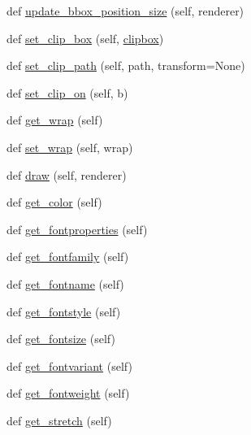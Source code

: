 \begin{DoxyCompactItemize}
def \hyperlink{classmatplotlib_1_1text_1_1Text_af4de2d279c8fad95c04018d1188960b4}{update\+\_\+bbox\+\_\+position\+\_\+size} (self, renderer)
\item 
def \hyperlink{classmatplotlib_1_1text_1_1Text_ad464adc595692ff1c184d74cd6a182c6}{set\+\_\+clip\+\_\+box} (self, \hyperlink{classmatplotlib_1_1artist_1_1Artist_abb9739de2f1e228609a20dcbd53a731f}{clipbox})
\item 
def \hyperlink{classmatplotlib_1_1text_1_1Text_a03c4097935702c4a223dd86e14b7819a}{set\+\_\+clip\+\_\+path} (self, path, transform=None)
\item 
def \hyperlink{classmatplotlib_1_1text_1_1Text_a0f96b758fd528650c490f1d503162bf4}{set\+\_\+clip\+\_\+on} (self, b)
\item 
def \hyperlink{classmatplotlib_1_1text_1_1Text_aaa6af891d2fb52262c23870d19213efb}{get\+\_\+wrap} (self)
\item 
def \hyperlink{classmatplotlib_1_1text_1_1Text_a1758ca7ed386fc6774fdeb2be1196d8e}{set\+\_\+wrap} (self, wrap)
\item 
def \hyperlink{classmatplotlib_1_1text_1_1Text_a8dc28767cc2d54bebd1bfb35ba837648}{draw} (self, renderer)
\item 
def \hyperlink{classmatplotlib_1_1text_1_1Text_a2ffd788f2fdfde2181504e7507848bdf}{get\+\_\+color} (self)
\item 
def \hyperlink{classmatplotlib_1_1text_1_1Text_abbd7ee4fe49a0a339a16b12e007165e0}{get\+\_\+fontproperties} (self)
\item 
def \hyperlink{classmatplotlib_1_1text_1_1Text_a8af166bdb85b8e7f9aa69c265e0f1fff}{get\+\_\+fontfamily} (self)
\item 
def \hyperlink{classmatplotlib_1_1text_1_1Text_a07685137063bbeba7304d6933963e1a8}{get\+\_\+fontname} (self)
\item 
def \hyperlink{classmatplotlib_1_1text_1_1Text_ab5f87a682ab1294d717bd1ed29cbfe7c}{get\+\_\+fontstyle} (self)
\item 
def \hyperlink{classmatplotlib_1_1text_1_1Text_ad4ea1fb9343a6dd93ad69a0644a57045}{get\+\_\+fontsize} (self)
\item 
def \hyperlink{classmatplotlib_1_1text_1_1Text_ae88796b9843ca847ab14c7391255cd16}{get\+\_\+fontvariant} (self)
\item 
def \hyperlink{classmatplotlib_1_1text_1_1Text_a353750be1b61b1b1b56876afdffcec91}{get\+\_\+fontweight} (self)
\item 
def \hyperlink{classmatplotlib_1_1text_1_1Text_acbabce1bac14afa7a32f4c4b331e5a56}{get\+\_\+stretch} (self)

\end{DoxyCompactItemize}
